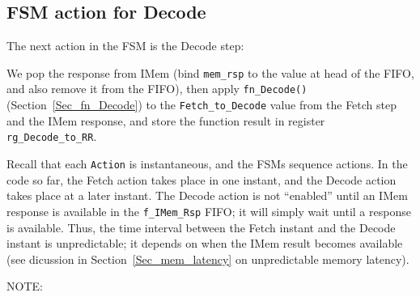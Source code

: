 
\subsection{FSM action for Decode}

The next action in the FSM is the Decode step:



We pop the response from IMem (bind \verb|mem_rsp| to the value at
head of the FIFO, and also remove it from the FIFO), then apply
\verb|fn_Decode()| (Section~\ref{Sec_fn_Decode}) to the
\verb|Fetch_to_Decode| value from the Fetch step and the IMem
response, and store the function result in register
\verb|rg_Decode_to_RR|.

Recall that each \verb|Action| is instantaneous, and the FSMs sequence
actions.  In the code so far, the Fetch action takes place in one
instant, and the Decode action takes place at a later instant. The
Decode action is not ``enabled'' until an IMem response is available
in the \verb|f_IMem_Rsp| FIFO; it will simply wait until a response is
available.  Thus, the time interval between the Fetch instant and the
Decode instant is unpredictable; it depends on when the IMem result
becomes available (see dicussion in Section~\ref{Sec_mem_latency} on
unpredictable memory latency).

\vspace{2ex}

NOTE:

